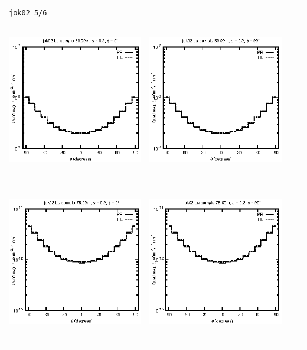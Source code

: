 \begin{tabular}{c c c c}
\multicolumn{4}{l}{\texttt{jok02 5/6}} \\
\includegraphics[height=7cm]{../eps/jok02_Lu_sample_50.00m_fwd.eps} &
\includegraphics[height=7cm]{../eps/jok02_Lu_sample_50.00m_cross.eps} \\
\includegraphics[height=7cm]{../eps/jok02_Lu_sample_75.00m_fwd.eps} &
\includegraphics[height=7cm]{../eps/jok02_Lu_sample_75.00m_cross.eps} \\

\end{tabular}

